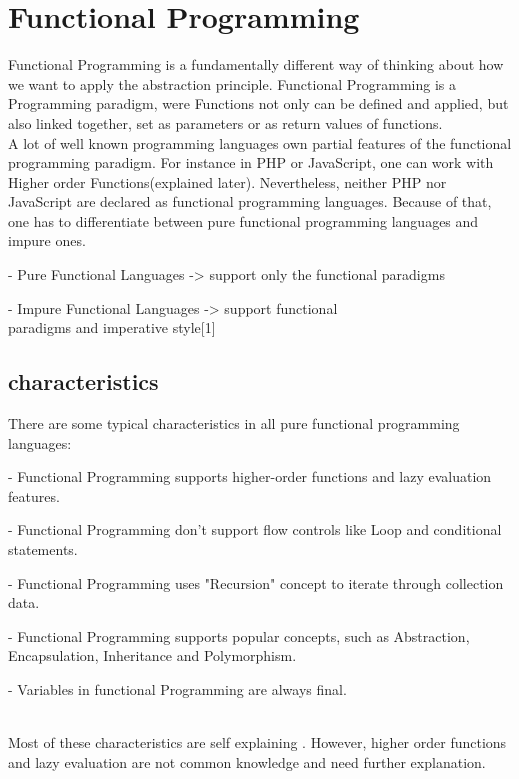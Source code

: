 \section{Functional Programming}
Functional Programming is a fundamentally  different way of thinking about how we want to apply the abstraction principle. Functional Programming is a Programming paradigm, were Functions not only can be defined and applied, but also linked together, set as parameters or as return values of functions.\\
A lot of well known programming languages own partial features of the functional programming paradigm. For instance in PHP or JavaScript, one can work with Higher order Functions(explained later). Nevertheless, neither PHP nor JavaScript are declared as functional programming languages. Because of that, one has to differentiate between pure functional programming languages and impure ones.\\
\begin{MyIndentedList}
    \begin{MyIndentedList}
        \item - Pure Functional Languages -> support only the functional paradigms
        \item - Impure Functional Languages -> support functional\\ paradigms and imperative style[1]
    \end{MyIndentedList}
\end{MyIndentedList}
\subsection{characteristics}
There are some typical characteristics in all pure functional programming languages:\\
\begin{MyIndentedList}
    \begin{MyIndentedList}
        \item - Functional Programming supports higher-order functions and lazy evaluation features.
        \item - Functional Programming don't support flow controls like Loop and conditional statements.
        \item - Functional Programming uses "Recursion" concept to iterate through collection data.
        \item - Functional Programming supports popular concepts, such as Abstraction, Encapsulation, Inheritance and Polymorphism.
        \item - Variables in functional Programming are always final.
    \end{MyIndentedList}
\end{MyIndentedList}\\
Most of these characteristics are self explaining . However, higher order functions and lazy evaluation are not common knowledge and need further explanation.
